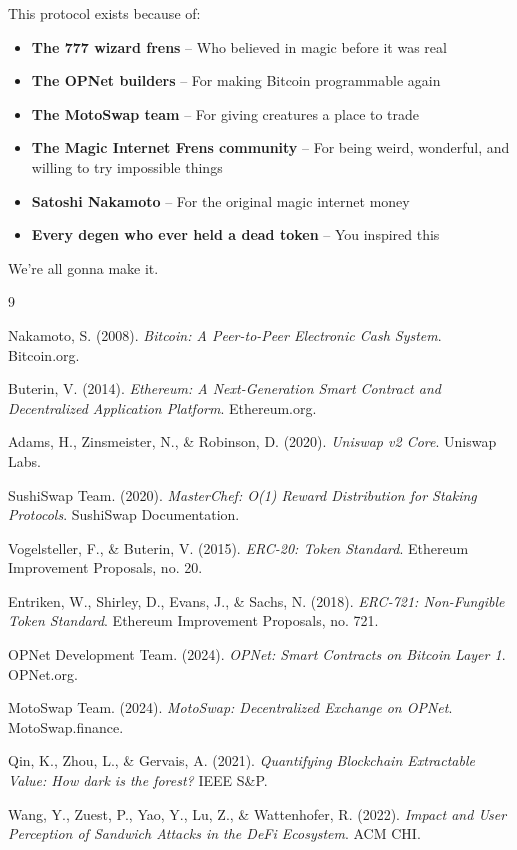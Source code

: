 \documentclass[11pt,a4paper]{article}
\begin{document}
This protocol exists because of:

\begin{itemize}
    \item \textbf{The 777 wizard frens} -- Who believed in magic before it was real
    \item \textbf{The OPNet builders} -- For making Bitcoin programmable again
    \item \textbf{The MotoSwap team} -- For giving creatures a place to trade
    \item \textbf{The Magic Internet Frens community} -- For being weird, wonderful, and willing to try impossible things
    \item \textbf{Satoshi Nakamoto} -- For the original magic internet money
    \item \textbf{Every degen who ever held a dead token} -- You inspired this
\end{itemize}

We're all gonna make it.

\begin{thebibliography}{9}

Nakamoto, S. (2008).
\textit{Bitcoin: A Peer-to-Peer Electronic Cash System}.
Bitcoin.org.

Buterin, V. (2014).
\textit{Ethereum: A Next-Generation Smart Contract and Decentralized Application Platform}.
Ethereum.org.

Adams, H., Zinsmeister, N., \& Robinson, D. (2020).
\textit{Uniswap v2 Core}.
Uniswap Labs.

SushiSwap Team. (2020).
\textit{MasterChef: O(1) Reward Distribution for Staking Protocols}.
SushiSwap Documentation.

Vogelsteller, F., \& Buterin, V. (2015).
\textit{ERC-20: Token Standard}.
Ethereum Improvement Proposals, no. 20.

Entriken, W., Shirley, D., Evans, J., \& Sachs, N. (2018).
\textit{ERC-721: Non-Fungible Token Standard}.
Ethereum Improvement Proposals, no. 721.

OPNet Development Team. (2024).
\textit{OPNet: Smart Contracts on Bitcoin Layer 1}.
OPNet.org.

MotoSwap Team. (2024).
\textit{MotoSwap: Decentralized Exchange on OPNet}.
MotoSwap.finance.

Qin, K., Zhou, L., \& Gervais, A. (2021).
\textit{Quantifying Blockchain Extractable Value: How dark is the forest?}
IEEE S\&P.

Wang, Y., Zuest, P., Yao, Y., Lu, Z., \& Wattenhofer, R. (2022).
\textit{Impact and User Perception of Sandwich Attacks in the DeFi Ecosystem}.
ACM CHI.

\end{thebibliography}
\end{document}
